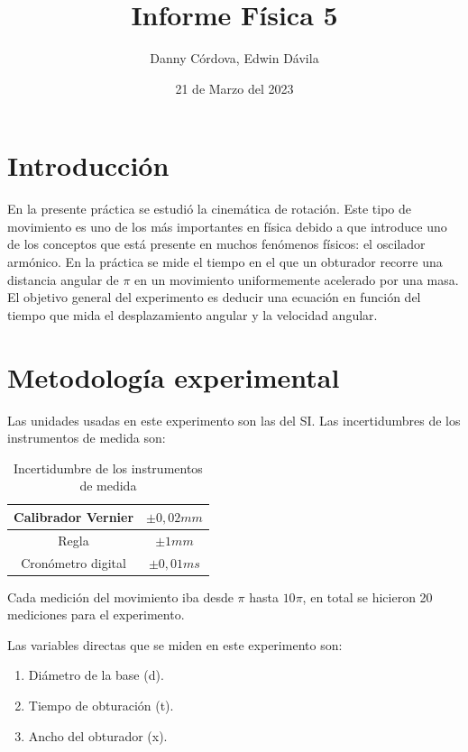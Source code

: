 \documentclass[a4paper]{article}
\title{Informe Física 5}
\author{Danny Córdova, Edwin Dávila}
\date{21 de Marzo del 2023}
\begin{document}
\maketitle

\section{Introducción}

En la presente práctica se estudió la cinemática de rotación. Este tipo de movimiento es uno de los más importantes en física debido a que introduce uno de los conceptos que está presente en muchos fenómenos físicos: el oscilador armónico. En la práctica se mide el tiempo en el que un obturador recorre una distancia angular de $\pi$ en un movimiento uniformemente acelerado por una masa. El objetivo general del experimento es deducir una ecuación en función del tiempo que mida el desplazamiento angular y la velocidad angular.

\section{Metodología experimental}

Las unidades usadas en este experimento son las del SI. Las incertidumbres de los instrumentos de medida son:

\begin{table}[H]
    \centering
    \begin{tabular}{|c|c|}
    \hline
        Calibrador Vernier & $\pm0,02 mm$ \\ \hline
        Regla  & $\pm 1 mm$ \\ \hline
        Cronómetro digital  & $\pm 0,01 ms$ \\ \hline
    \end{tabular}
    \caption{Incertidumbre de los instrumentos de medida}
    \label{Incertidumbre de los instrumentos de medida}
\end{table}

Cada medición del movimiento iba desde $\pi$ hasta $10\pi$, en total se hicieron 20 mediciones para el experimento. 

Las variables directas que se miden en este experimento son:
\begin{enumerate}
  \item Diámetro de la base (d).
  \item Tiempo de obturación (t).
  \item Ancho del obturador (x).
\end{enumerate}
\end{document}
